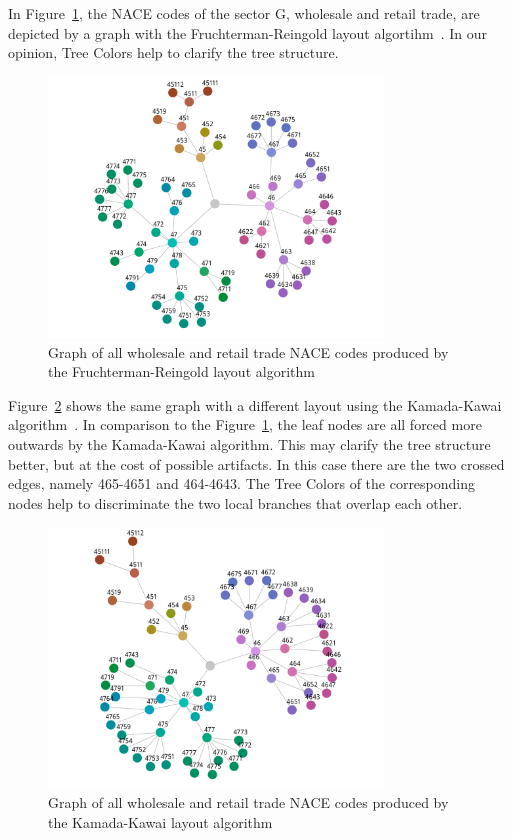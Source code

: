 \documentclass[journal]{vgtc}                %
\begin{document}
In Figure~\ref{fig:graphFRApp}, the NACE codes of the sector G, wholesale and retail trade, are depicted by a graph with the Fruchterman-Reingold layout algortihm~\cite{Fruchterman91}. In our opinion, Tree Colors help to clarify the tree structure.

\begin{figure}[tb]
  \centering
  \includegraphics[width=3.5in]{Gbusiness_FR.pdf}
  \caption{Graph of all wholesale and retail trade NACE codes produced by the Fruchterman-Reingold layout algorithm}\label{fig:graphFRApp}
\end{figure}

Figure~\ref{fig:graphKKApp} shows the same graph with a different layout using the Kamada-Kawai algorithm~\cite{Kamada89}. In comparison to the Figure~\ref{fig:graphFRApp}, the leaf nodes are all forced more outwards by the Kamada-Kawai algorithm. This may clarify the tree structure better, but at the cost of possible artifacts. In this case there are the two crossed edges, namely 465-4651 and 464-4643. The Tree Colors of the corresponding nodes help to discriminate the two local branches that overlap each other.

\begin{figure}[tb]
  \centering
  \includegraphics[width=3.5in]{Gbusiness_KK.pdf}
  \caption{Graph of all wholesale and retail trade NACE codes produced by the Kamada-Kawai layout algorithm}\label{fig:graphKKApp}
\end{figure}
\end{document}
